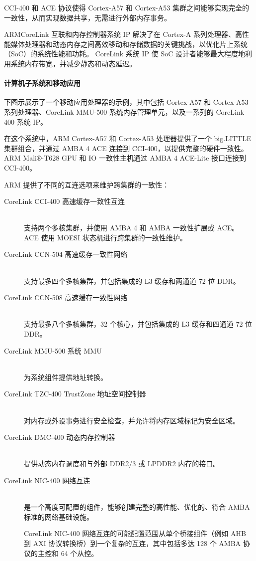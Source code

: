 CCI-400 和 ACE 协议使得 Cortex-A57 和 Cortex-A53 集群之间能够实现完全的一致性，从而实现数据共享，无需进行外部内存事务。

ARMCoreLink 互联和内存控制器系统 IP 解决了在 Cortex-A 系列处理器、高性能媒体处理器和动态内存之间高效移动和存储数据的关键挑战，以优化片上系统（SoC）的系统性能和功耗。
CoreLink 系统 IP 使 SoC 设计者能够最大程度地利用系统内存带宽，并减少静态和动态延迟。

\paragraph{计算机子系统和移动应用}

下图示展示了一个移动应用处理器的示例，其中包括 Cortex-A57 和 Cortex-A53 系列处理器、CoreLink MMU-500 系统内存管理单元，以及一系列的 CoreLink 400 系统 IP。


在这个系统中，ARM
Cortex-A57 和 Cortex-A53 处理器提供了一个 big.LITTLE 集群组合，并通过 AMBA 4
ACE 连接到 CCI-400，以提供完整的硬件一致性。
ARM Mali®-T628
GPU 和 IO 一致性主机通过 AMBA 4 ACE-Lite 接口连接到 CCI-400。

ARM 提供了不同的互连选项来维护跨集群的一致性：

\begin{description}
  \item [CoreLink CCI-400 高速缓存一致性互连] \hfill \\
    支持两个多核集群，并使用 AMBA
    4 和 AMBA 一致性扩展或 ACE。
    ACE 使用 MOESI 状态机进行跨集群的一致性维护。
  \item [CoreLink CCN-504 高速缓存一致性网络] \hfill \\
    支持最多四个多核集群，并包括集成的 L3 缓存和两通道 72 位 DDR。
  \item [CoreLink CCN-508 高速缓存一致性网络] \hfill \\
    支持最多八个多核集群，32 个核心，并包括集成的 L3 缓存和四通道 72 位 DDR。
  \item [CoreLink MMU-500 系统 MMU] \hfill \\
    为系统组件提供地址转换。
  \item [CoreLink TZC-400 TrustZone 地址空间控制器] \hfill \\
    对内存或外设事务进行安全检查，并允许将内存区域标记为安全区域。
  \item [CoreLink DMC-400 动态内存控制器] \hfill \\
    提供动态内存调度和与外部 DDR2/3 或 LPDDR2 内存的接口。
  \item [CoreLink NIC-400 网络互连] \hfill \\
    是一个高度可配置的组件，能够创建完整的高性能、优化的、符合 AMBA 标准的网络基础设施。

    CoreLink NIC-400 网络互连的可能配置范围从单个桥接组件（例如 AHB 到 AXI 协议转换桥）到一个复杂的互连，其中包括多达 128 个 AMBA 协议的主控和 64 个从控。
\end{description}
